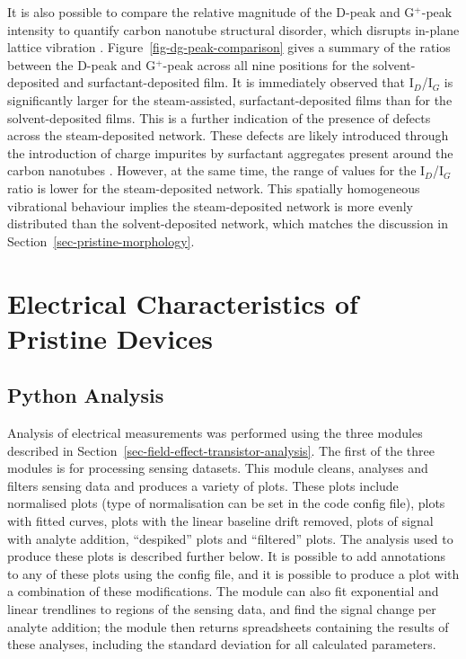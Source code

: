 \documentclass[
  a4paper,
]{scrbook}
\begin{document}
It is also possible to compare the relative magnitude of the D-peak and
G\(^+\)-peak intensity to quantify carbon nanotube structural disorder,
which disrupts in-plane lattice vibration
\autocite{Dresselhaus2005,King2014}. Figure~\ref{fig-dg-peak-comparison}
gives a summary of the ratios between the D-peak and G\(^+\)-peak across
all nine positions for the solvent-deposited and surfactant-deposited
film. It is immediately observed that I\(_{D}\)/I\(_{G}\) is
significantly larger for the steam-assisted, surfactant-deposited films
than for the solvent-deposited films. This is a further indication of
the presence of defects across the steam-deposited network. These
defects are likely introduced through the introduction of charge
impurites by surfactant aggregates present around the carbon nanotubes
\autocite{Christensen2022}. However, at the same time, the range of
values for the I\(_{D}\)/I\(_{G}\) ratio is lower for the
steam-deposited network. This spatially homogeneous vibrational
behaviour implies the steam-deposited network is more evenly distributed
than the solvent-deposited network, which matches the discussion in
Section~\ref{sec-pristine-morphology}.

\hypertarget{sec-pristine-electrical-characterisation}{%
\section{Electrical Characteristics of Pristine
Devices}\label{sec-pristine-electrical-characterisation}}

\hypertarget{sec-python-analysis}{%
\subsection{Python Analysis}\label{sec-python-analysis}}

Analysis of electrical measurements was performed using the three
modules described in Section~\ref{sec-field-effect-transistor-analysis}.
The first of the three modules is for processing sensing datasets. This
module cleans, analyses and filters sensing data and produces a variety
of plots. These plots include normalised plots (type of normalisation
can be set in the code config file), plots with fitted curves, plots
with the linear baseline drift removed, plots of signal with analyte
addition, ``despiked'' plots and ``filtered'' plots. The analysis used
to produce these plots is described further below. It is possible to add
annotations to any of these plots using the config file, and it is
possible to produce a plot with a combination of these modifications.
The module can also fit exponential and linear trendlines to regions of
the sensing data, and find the signal change per analyte addition; the
module then returns spreadsheets containing the results of these
analyses, including the standard deviation for all calculated
parameters.
\end{document}
